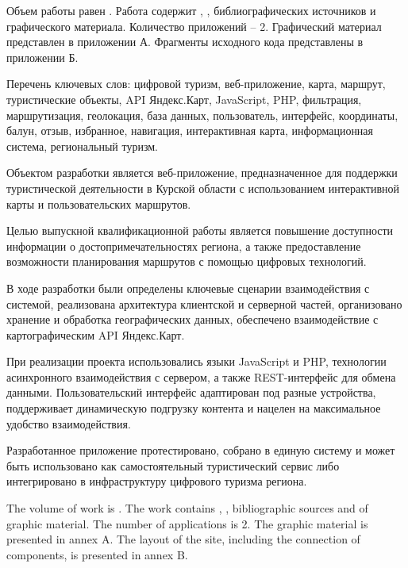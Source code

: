 
Объем работы равен . Работа содержит , ,  библиографических источников и  графического материала. Количество приложений – 2. Графический материал представлен в приложении А. Фрагменты исходного кода представлены в приложении Б.

Перечень ключевых слов: цифровой туризм, веб-приложение, карта, маршрут, туристические объекты, API Яндекс.Карт, JavaScript, PHP, фильтрация, маршрутизация, геолокация, база данных, пользователь, интерфейс, координаты, балун, отзыв, избранное, навигация, интерактивная карта, информационная система, региональный туризм.

Объектом разработки является веб-приложение, предназначенное для поддержки туристической деятельности в Курской области с использованием интерактивной карты и пользовательских маршрутов.

Целью выпускной квалификационной работы является повышение доступности информации о достопримечательностях региона, а также предоставление возможности планирования маршрутов с помощью цифровых технологий.

В ходе разработки были определены ключевые сценарии взаимодействия с системой, реализована архитектура клиентской и серверной частей, организовано хранение и обработка географических данных, обеспечено взаимодействие с картографическим API Яндекс.Карт.

При реализации проекта использовались языки JavaScript и PHP, технологии асинхронного взаимодействия с сервером, а также REST-интерфейс для обмена данными. Пользовательский интерфейс адаптирован под разные устройства, поддерживает динамическую подгрузку контента и нацелен на максимальное удобство взаимодействия.

Разработанное приложение протестировано, собрано в единую систему и может быть использовано как самостоятельный туристический сервис либо интегрировано в инфраструктуру цифрового туризма региона.

  
The volume of work is . The work contains , ,  bibliographic sources and  of graphic material. The number of applications is 2. The graphic material is presented in annex A. The layout of the site, including the connection of components, is presented in annex B.


